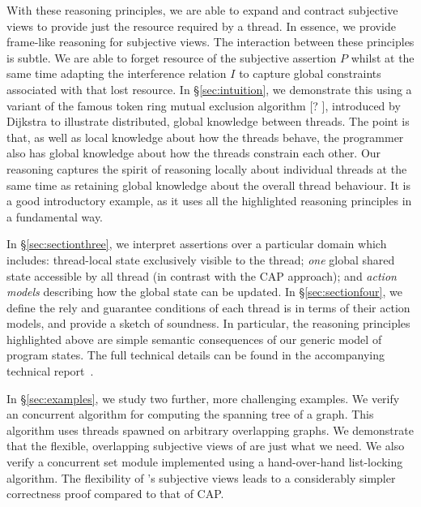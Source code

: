 





With these reasoning principles, we are able to expand and contract
subjective views  to provide just the resource required by a thread.
In essence, we provide  frame-like reasoning for  subjective  views. 
The interaction between  these principles is
subtle. We are able to forget resource of the subjective assertion $P$
 whilst at the same time adapting the interference relation $I$  to
capture global constraints associated with that lost resource. In 
\S\ref{sec:intuition}, we 
demonstrate this using 
a variant of the famous  token ring mutual exclusion algorithm [? ],
introduced by Dijkstra to illustrate distributed, global knowledge between
threads. The point is that, as well as local knowledge
about how the threads behave, the programmer also has global knowledge
about how the threads constrain each other. Our reasoning captures the
spirit of reasoning locally about individual threads at the same time
as retaining global knowledge about the overall thread behaviour. It
is a good  introductory example, as it uses all the highlighted \colosl
reasoning principles in a fundamental way. 


In \S\ref{sec:sectionthree}, we interpret \colosl assertions
 over a particular domain which includes: thread-local
state exclusively visible to the thread; {\em one} global shared state
accessible by all thread (in contrast with the CAP approach); and {\em
  action models} describing how the global state can be updated.  In
\S\ref{sec:sectionfour}, we define the rely and guarantee conditions
of each thread is in terms of their action models, and provide a
sketch of soundness. In particular, the
reasoning principles highlighted above are simple semantic
consequences of our generic model of program states.  The full
technical details can
be found 
in the accompanying technical report~\cite{.}.



In \S\ref{sec:examples}, we 
study two further, more challenging examples. We verify an concurrent algorithm for
computing the spanning tree of a graph. This algorithm uses threads
spawned on arbitrary overlapping graphs. We demonstrate that the flexible, overlapping
subjective views of \colosl are just what we need. 
We also verify a concurrent set module
implemented using a hand-over-hand list-locking
algorithm. 
The flexibility of \colosl's subjective views  leads to a
considerably simpler correctness proof   compared to that of CAP. 


